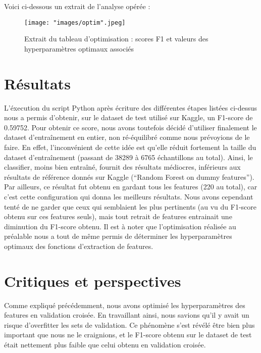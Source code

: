 \documentclass{article}
\begin{document}
Voici ci-dessous un extrait de l'analyse opérée :\\

\begin{figure}[h]
\begin{center}
\texttt{[image: "images/optim".jpeg]}
\caption{Extrait du tableau d'optimisation : scores F1 et valeurs des hyperparamètres optimaux associés}
\end{center}
\end{figure}



\section{\hspace{0.3cm} Résultats}

L'éxecution du script Python après écriture des différentes étapes listées ci-dessus nous a permis d'obtenir, sur le dataset de test utilisé sur Kaggle, un F1-score de 0.59752. Pour obtenir ce score, nous avons toutefois décidé d'utiliser finalement le dataset d'entraînement en entier, non ré-équilibré comme nous prévoyions de le faire. En effet, l'inconvénient de cette idée est qu'elle réduit fortement la taille du dataset d'entraînement (passant de 38289 à 6765 échantillons au total). Ainsi, le classifier, moins bien entraîné, fournit des résultats médiocres, inférieurs aux résultats de référence donnés sur Kaggle (``Random Forest on dummy features''). Par ailleurs, ce résultat fut obtenu en gardant tous les features (220 au total), car c'est cette configuration qui donna les meilleurs résultats. Nous avons cependant tenté de ne garder que ceux qui semblaient les plus pertinents (au vu du F1-score obtenu sur ces features seuls), mais tout retrait de features entrainait une diminution du F1-score obtenu. Il est à noter que l'optimisation réalisée au préalable nous a tout de même permis de déterminer les hyperparamètres optimaux des fonctions d'extraction de features.


\section{\hspace{0.3cm} Critiques et perspectives}

Comme expliqué précédemment, nous avons optimisé les hyperparamètres des features en validation croisée. En travaillant ainsi, nous savions qu'il y avait un risque d'overfitter les sets de validation. Ce phénomène s'est révélé être bien plus important que nous ne le craignions, et le F1-score obtenu sur le dataset de test était nettement plus faible que celui obtenu en validation croisée.
\end{document}
